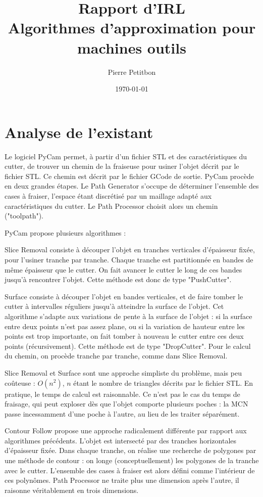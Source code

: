 \documentclass{article}
\title{Rapport d'IRL\\Algorithmes d'approximation pour machines outils}
\author{Pierre Petitbon}
\date{\today}
\begin{document}
\maketitle

\section{Analyse de l'existant}

Le logiciel PyCam permet, à partir d'un fichier STL et des caractéristiques du cutter, de trouver un chemin de la fraiseuse pour usiner l'objet décrit par le fichier STL. Ce chemin est décrit par le fichier GCode de sortie.
PyCam procède en deux grandes étapes.
Le Path Generator s'occupe de déterminer l'ensemble des cases à fraiser, l'espace étant discrétisé par un maillage adapté aux caractéristiques du cutter.
Le Path Processor choisit alors un chemin ("toolpath").

PyCam propose plusieurs algorithmes :

Slice Removal consiste à découper l'objet en tranches verticales d'épaisseur fixée, pour l'usiner tranche par tranche. Chaque tranche est partitionnée en bandes de même épaisseur que le cutter. On fait avancer le cutter le long de ces bandes jusqu'à rencontrer l'objet. Cette méthode est donc de type "PushCutter".

Surface consiste à découper l'objet en bandes verticales, et de faire tomber le cutter à intervalles réguliers jusqu'à atteindre la surface de l'objet. Cet algorithme s'adapte aux variations de pente à la surface de l'objet : si la surface entre deux points n'est pas assez plane, ou si la variation de hauteur entre les points est trop importante, on fait tomber à nouveau le cutter entre ces deux points (récursivement). Cette méthode est de type "DropCutter". Pour le calcul du chemin, on procède tranche par tranche, comme dans Slice Removal.

Slice Removal et Surface sont une approche simpliste du problème, mais peu coûteuse : $O(n^{2})$, $n$ étant le nombre de triangles décrits par le fichier STL. En pratique, le temps de calcul est raisonnable. Ce n'est pas le cas du temps de fraisage, qui peut exploser dès que l'objet comporte plusieurs poches : la MCN passe incessamment d'une poche à l'autre, au lieu de les traiter séparément.

Contour Follow propose une approche radicalement différente par rapport aux algorithmes précédents. L'objet est intersecté par des tranches horizontales d'épaisseur fixée. Dans chaque tranche, on réalise une recherche de polygones par une méthode de contour : on longe (conceptuellement) les polygones de la tranche avec le cutter. L'ensemble des cases à fraiser est alors défini comme l'intérieur de ces polynômes. Path Processor ne traite plus une dimension après l'autre, il raisonne véritablement en trois dimensions.
\end{document}
